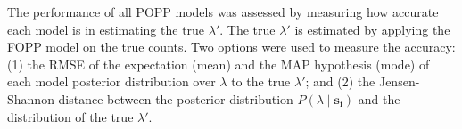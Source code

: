 
The performance of all POPP models was assessed by measuring how accurate each model is in estimating the true $\lambda'$. The true $\lambda'$ is estimated by applying the FOPP model on the true counts. Two options were used to measure the accuracy: (1) the RMSE of the expectation (mean) and the MAP hypothesis (mode) of each model posterior distribution over $\lambda$ to the true $\lambda'$; and (2)  the Jensen-Shannon distance between the posterior distribution $P(\lambda \mid \mathbf{s_i})$ and the distribution of the true $\lambda'$. 

